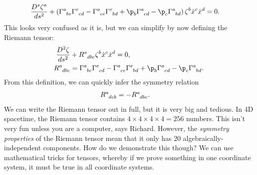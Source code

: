 \documentclass[a4paper, 11pt, normalem]{report}
\begin{document}
\begin{align}
    \frac{D^s\zeta^a}{ds^2} &+ \left(\tensor{\Gamma}{^a_{be}}\tensor{\Gamma}{^e_{cd}}-\tensor{\Gamma}{^a_{ce}}\tensor{\Gamma}{^e_{bd}}+\p_b\tensor{\Gamma}{^a_{cd}}-\p_c\tensor{\Gamma}{^a_{bd}}\right)\zeta^b\dot{x}^c\dot{x}^d = 0.
\end{align}
This looks very confused as it is, but we can simplify by now defining the Riemann tensor:
\begin{align}
    \frac{D^2\zeta}{ds^2} &+ \tensor{R}{^a_{dbc}}\zeta^b\dot{x}^c\dot{x}^d = 0,\\
    \tensor{R}{^a_{dbc}} &= \tensor{\Gamma}{^a_{bc}}\tensor{\Gamma}{^e_{cd}} - \tensor{\Gamma}{^a_{ce}}\tensor{\Gamma}{^e_{bd}} + \p_b\tensor{\Gamma}{^a_{cd}}-\p_c\tensor{\Gamma}{^a_{bd}}.
\end{align}
From this definition, we can quickly infer the symmetry relation
\begin{align}
    \tensor{R}{^a_{dcb}} &= -\tensor{R}{^a_{dbc}}.
\end{align}
We can write the Riemann tensor out in full, but it is very big and tedious. 
In 4D spacetime, the Riemann tensor contains $4\times4\times4\times4 = 256$ numbers.
This isn't very fun unless you are a computer, says Richard.
However, the \emph{symmetry properties} of the Riemann tensor mean that it only has 20 algebraically-independent components. 
How do we demonstrate this though?
We can use mathematical tricks for tensors, whereby if we prove something in one coordinate system, it must be true in all coordinate systems.
\end{document}
